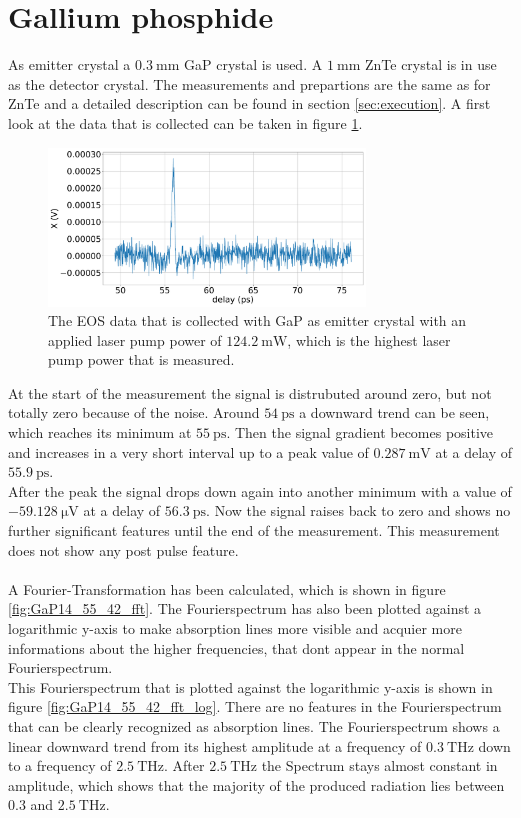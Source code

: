 \FloatBarrier
\section{Gallium phosphide}
As emitter crystal a $\SI{0.3}{\milli\meter}$ GaP crystal is used.
A $\SI{1}{\milli\meter}$ ZnTe crystal is in use as the detector crystal.
The measurements and prepartions are the same as for ZnTe and a detailed description can be found in section \ref{sec:execution}.
A first look at the data that is collected can be taken in figure \ref{fig:GaP14_55_42normalX}.
\\
\begin{figure}
    \centering
    \includegraphics[width=0.75\textwidth]{Plots/GaP14_55_42normalX.pdf}
    \caption{The EOS data that is collected with GaP as emitter crystal with an applied laser pump power of $\SI{124.2}{\milli\W}$, which is the highest laser pump power that is measured.}
    \label{fig:GaP14_55_42normalX}
\end{figure}
At the start of the measurement the signal is distrubuted around zero, but not totally zero because of the noise.
Around $\SI{54}{\pico\second}$ a downward trend can be seen, which reaches its minimum at $\SI{55}{\pico\second}$.
Then the signal gradient becomes positive and increases in a very short interval up to a peak value of $\SI{0.287}{\milli\V}$ at a delay of $\SI{55.9}{\pico\second}$.
\\
After the peak the signal drops down again into another minimum with a value of $\SI{-59.128}{\micro\V}$ at a delay of $\SI{56.3}{\pico\second}$.
Now the signal raises back to zero and shows no further significant features until the end of the measurement.
This measurement does not show any post pulse feature.
\\\\
A Fourier-Transformation has been calculated, which is shown in figure \ref{fig:GaP14_55_42_fft}.
The Fourierspectrum has also been plotted against a logarithmic y-axis to make absorption lines more visible and acquier more informations about the higher frequencies, that dont appear in the normal Fourierspectrum.
\\
This Fourierspectrum that is plotted against the logarithmic y-axis is shown in figure \ref{fig:GaP14_55_42_fft_log}.
There are no features in the Fourierspectrum that can be clearly recognized as absorption lines.
The Fourierspectrum shows a linear downward trend from its highest amplitude at a frequency of $\SI{0.3}{\tera\hertz}$ down to a frequency of $\SI{2.5}{\tera\hertz}$.
After $\SI{2.5}{\tera\hertz}$ the Spectrum stays almost constant in amplitude, which shows that the majority of the produced radiation lies between $0.3$ and $\SI{2.5}{\tera\hertz}$.

